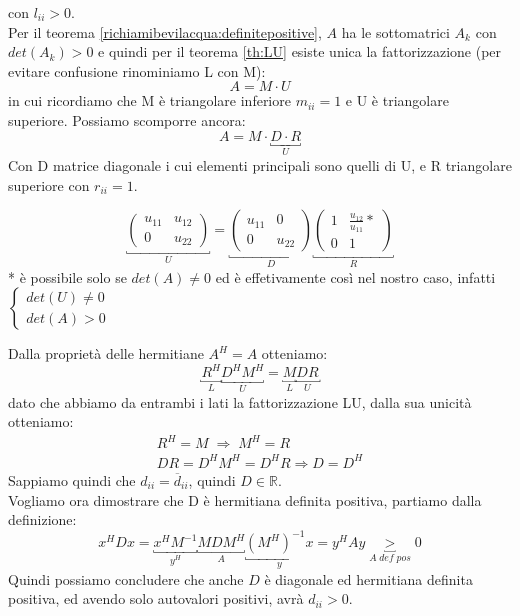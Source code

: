 \begin{thproof}
  con $l_{ii} > 0$. \\
  Per il teorema \ref{richiamibevilacqua:definitepositive},
  $A$ ha le sottomatrici $A_k$ con $det(A_k) > 0$ e quindi per il
  teorema \ref{th:LU} esiste unica la fattorizzazione (per evitare
  confusione rinominiamo L con M):
  $$ A = M \cdot U $$
  in cui ricordiamo che M \`e triangolare inferiore $m_{ii}=1$ e U \`e
  triangolare superiore. Possiamo scomporre ancora:
  $$ A = M \cdot \underbracket{D \cdot R}_{U}$$
  Con D matrice diagonale i cui elementi principali sono quelli di U,
  e R triangolare superiore con $r_{ii} = 1$.

  $$
  \underbracket{
    \begin{pmatrix}
      u_{11} & u_{12}  \\
      0     & u_{22}
    \end{pmatrix}}_{U} = \underbracket{
    \begin{pmatrix}
      u_{11} & 0  \\
      0     & u_{22}
    \end{pmatrix}}_{D} \underbracket{
    \begin{pmatrix}
      1 & \frac{u_{12}}{u_{11}} * \\
      0 & 1
    \end{pmatrix}}_{R}
  $$
* \`e possibile solo se $det(A)\neq0$ ed \`e effetivamente così nel nostro
caso, infatti $\left\{
  \begin{array}{l}
    det(U) \neq 0 \\
    det(A) > 0
  \end{array}
\right.$

Dalla propriet\`a delle hermitiane $A^{H} = A$ otteniamo:
$$ \underbracket{R^{H}}_{L}\underbracket{D^{H} M^{H}}_{U} =
\underbracket{M}_{L}\underbracket{DR}_{U} $$ dato che abbiamo da entrambi i lati
la fattorizzazione LU, dalla sua unicit\`a otteniamo: 
\[\begin{array}{l}
  R^{H} = M \; \Rightarrow \; M^{H} = R \\
  DR = D^{H}M^{H}= D^{H}R  \Rightarrow  D = D^{H}
\end{array}\]
Sappiamo quindi che $d_{ii}  = \overline{d}_{ii}$, quindi $D \in
\mathbb{R}$.\\

Vogliamo ora dimostrare che D \`e hermitiana definita positiva, partiamo
dalla definizione:
$$ x^{H}Dx = \underbracket{x^{H} M^{-1}}_{y^{H}}
\underbracket{MDM^{H}}_{A} \underbracket{(M^{H})^{-1} x}_{y} = y^{H}Ay
\underbracket{>}_{A\;def\;pos} 0 $$
Quindi possiamo concludere che anche $D$ \`e diagonale ed hermitiana
definita positiva, ed avendo solo autovalori positivi, avr\`a $d_{ii}>0$.\\


\end{thproof}
